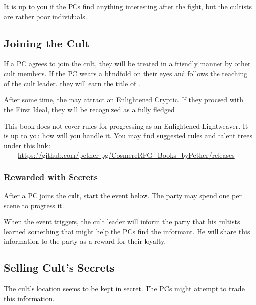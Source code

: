 It is up to you if the PCs find anything interesting after the fight, but the cultists are rather poor individuals.
\newpage


\subsection{Joining the Cult}

If a PC agrees to join the cult, they will be treated in a friendly manner by other cult members. If the PC wears a blindfold on their eyes and follows the teaching of the cult leader, they will earn the title of \enemyCorruptedLightweaverNameA{}.

After some time, the \enemyCorruptedLightweaverNameA{} may attract an Enlightened Cryptic. If they proceed with the First Ideal, they will be recognized as a fully fledged \enemyCorruptedLightweaverNameB{}.

This book does not cover rules for progressing as an Enlightened Lightweaver. It is up to you how will you handle it. You may find suggested rules and talent trees under this link: \\

~~~~\url{https://github.com/pether-pg/CosmereRPG_Books_byPether/releases}


\subsubsection{Rewarded with Secrets}

After a PC joins the cult, start the event below. The party may spend one \iconOpp{} per scene to progress it. 

When the event triggers, the cult leader will inform the party that his cultists learned something that might help the PCs find the informant. He will share this information to the party as a reward for their loyalty. \\




\subsection{Selling Cult's Secrets}

The cult's location seems to be kept in secret. The PCs might attempt to trade this information.

